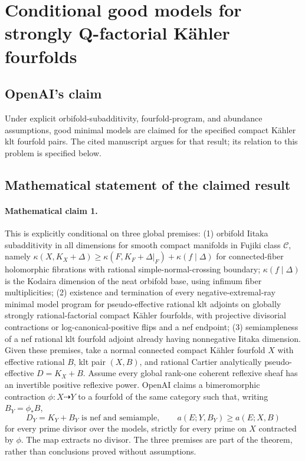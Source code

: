 \documentclass[11pt]{article}
\begin{document}
\section*{Conditional good models for strongly Q-factorial Kähler fourfolds}

\subsection{OpenAI's claim}
Under explicit orbifold-subadditivity, fourfold-program, and abundance assumptions, good minimal models are claimed for the specified compact Kähler klt fourfold pairs. The cited manuscript argues for that result; its relation to this problem is specified below.

\subsection{Mathematical statement of the claimed result}
\paragraph{Mathematical claim 1.} This is explicitly conditional on three global premises: (1) orbifold Iitaka subadditivity in all dimensions for smooth compact manifolds in Fujiki class $\mathcal C$, namely $\kappa(X,K_X+\Delta)\ge\kappa(F,K_F+\Delta|_F)+\kappa(f\mid\Delta)$ for connected-fiber holomorphic fibrations with rational simple-normal-crossing boundary; $\kappa(f\mid\Delta)$ is the Kodaira dimension of the neat orbifold base, using infimum fiber multiplicities; (2) existence and termination of every negative-extremal-ray minimal model program for pseudo-effective rational klt adjoints on globally strongly rational-factorial compact Kähler fourfolds, with projective divisorial contractions or log-canonical-positive flips and a nef endpoint; (3) semiampleness of a nef rational klt fourfold adjoint already having nonnegative Iitaka dimension.
Given these premises, take a normal connected compact Kähler fourfold $X$ with effective rational $B$, klt pair $(X,B)$, and rational Cartier analytically pseudo-effective $D=K_X+B$. Assume every global rank-one coherent reflexive sheaf has an invertible positive reflexive power. OpenAI claims a bimeromorphic contraction $\phi:X\dashrightarrow Y$ to a fourfold of the same category such that, writing $B_Y=\phi_*B$,
\[
D_Y=K_Y+B_Y\text{ is nef and semiample},\qquad
 a(E;Y,B_Y)\ge a(E;X,B)
\]
for every prime divisor over the models, strictly for every prime on $X$ contracted by $\phi$. The map extracts no divisor. The three premises are part of the theorem, rather than conclusions proved without assumptions.
\end{document}
